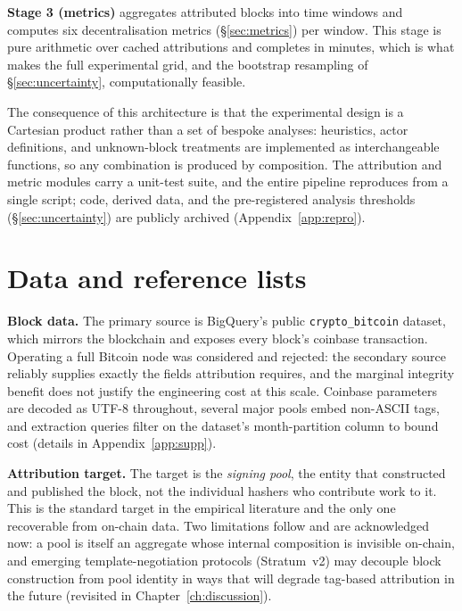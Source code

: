 \documentclass[logo,msc]{infthesis}           %
\begin{document}
\textbf{Stage 3 (metrics)} aggregates attributed blocks into time windows and
computes six decentralisation metrics (\S\ref{sec:metrics}) per window. This
stage is pure arithmetic over cached attributions and completes in minutes,
which is what makes the full experimental grid, and the bootstrap
resampling of \S\ref{sec:uncertainty}, computationally feasible.
 
The consequence of this architecture is that the experimental design is a
Cartesian product rather than a set of bespoke analyses: heuristics, actor
definitions, and unknown-block treatments are implemented as interchangeable
functions, so any combination is produced by composition. The attribution and
metric modules carry a unit-test suite, and the entire pipeline reproduces from
a single script; code, derived data, and the pre-registered analysis
thresholds (\S\ref{sec:uncertainty}) are publicly archived
(Appendix~\ref{app:repro}).%
 
\section{Data and reference lists}
\label{sec:data}
 
\textbf{Block data.} The primary source is BigQuery's public
\texttt{crypto\_bitcoin} dataset, which mirrors the blockchain and exposes
every block's coinbase transaction. Operating a full Bitcoin node was
considered and rejected: the secondary source reliably supplies exactly the
fields attribution requires, and the marginal integrity benefit does not
justify the engineering cost at this scale. Coinbase parameters are decoded as
UTF-8 throughout, several major pools embed non-ASCII tags, and
extraction queries filter on the dataset's month-partition column to bound
cost (details in Appendix~\ref{app:supp}).
 
\textbf{Attribution target.} The target is the \emph{signing pool}, the
entity that constructed and published the block, not the individual hashers
who contribute work to it. This is the standard target in the empirical
literature \cite{romiti2019deep,gencer2018decentralization} and the only one
recoverable from on-chain data. Two limitations follow and are acknowledged
now: a pool is itself an aggregate whose internal composition is invisible
on-chain, and emerging template-negotiation protocols (Stratum~v2) may
decouple block construction from pool identity in ways that will degrade
tag-based attribution in the future (revisited in
Chapter~\ref{ch:discussion}).
 
\end{document}
